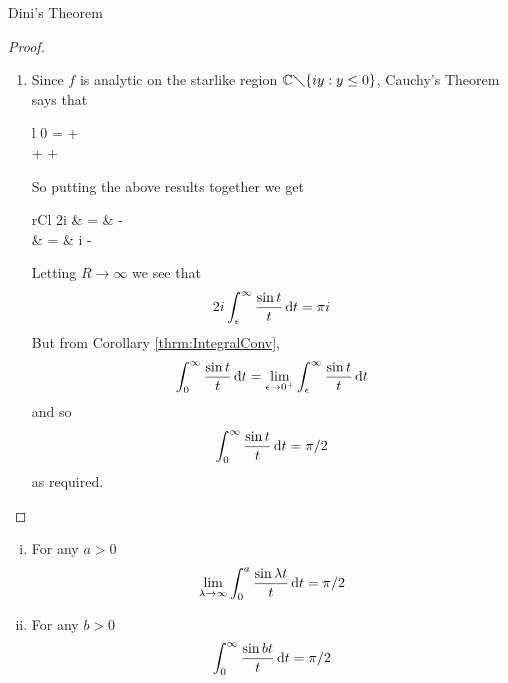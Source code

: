 \begin{section}{Dini's Theorem}
\begin{proof}
\begin{enumerate}[{Step} 1.]
		\item
			Since $f$ is analytic on the starlike region	$\mathbb{C}
			\diagdown \{iy: y \leq 0\}$, Cauchy's Theorem says that
				\begin{IEEEeqnarray*}{l}
					0 =  +
						 \\
					+ \; 
						+ 
				\end{IEEEeqnarray*}
			So putting the above results together we get
				\begin{IEEEeqnarray*}{rCl}
					2i \myinta{\epsilon}{R}{\frac{\sin t}{t}}{t}
						& = & \myintc[\gamma_\epsilon]{f(z)}{z}
						- \myintc[\gamma_R]{f(z)}{z} \\
					& = & \pi i - \myintc[\gamma_R]{f(z)}{z}
				\end{IEEEeqnarray*}
			Letting $R \rightarrow \infty$ we see that
				\begin{displaymath}
					2i \int_{\epsilon}^{\infty}{\frac{\sin t}{t}}\, \mathrm{d}{t}
						= \pi i
				\end{displaymath}
			But from Corollary \ref{thrm:IntegralConv},
				\begin{displaymath}
					\int_{0}^{\infty}{\frac{\sin t}{t}}\, \mathrm{d}{t}
						= \lim_{\epsilon \rightarrow 0^+}
						\int_{\epsilon}^{\infty}{\frac{\sin t}{t}}\, \mathrm{d}{t}		
				\end{displaymath}
			and so
				\begin{displaymath}
					\int_{0}^{\infty}{\frac{\sin t}{t}}\, \mathrm{d}{t}
						= \pi/2
				\end{displaymath}
			as required.
	\end{enumerate}
\end{proof}

\begin{cor}\label{cor:Dini2}
	\begin{enumerate}[i)]
		\item
			For any $a > 0$
				\begin{displaymath}
					\lim_{\lambda \rightarrow \infty}
						\int_{0}^{a}{\frac{\sin \lambda t}{t}}\, \mathrm{d}{t}
						= \pi/2
				\end{displaymath}
		\item
			For any $b > 0$
				\begin{displaymath}
					\int_{0}^{\infty}{\frac{\sin bt}{t}}\, \mathrm{d}{t}
						= \pi/2
				\end{displaymath}
	\end{enumerate}
\end{cor}


\end{section}
